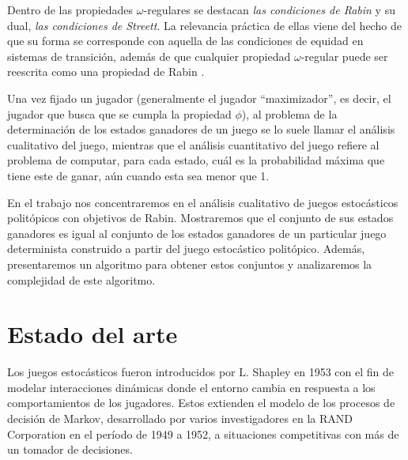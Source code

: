 Dentro de las propiedades $\omega$-regulares se destacan \textit{las
	condiciones de Rabin} y su dual, \textit{las condiciones de Streett}. La
relevancia práctica de ellas viene del hecho de que su forma se corresponde con
aquella de las condiciones de equidad en sistemas de transición, además de que
cualquier propiedad $\omega$-regular puede ser reescrita como una propiedad de
Rabin \cite{AutomataLogicsInfiniteGames}.

Una vez fijado un jugador (generalmente el jugador ``maximizador'', es decir,
el jugador que busca que se cumpla la propiedad $\phi$), al problema de la
determinación de los estados ganadores de un juego se lo suele llamar el
análisis cualitativo del juego, mientras que el análisis cuantitativo del juego
refiere al problema de computar, para cada estado, cuál es la probabilidad
máxima que tiene este de ganar, aún cuando esta sea menor que 1.

En el trabajo nos concentraremos en el análisis cualitativo de juegos
estocásticos politópicos con objetivos de Rabin. Mostraremos que el conjunto de
sus estados ganadores es igual al conjunto de los estados ganadores de un
particular juego determinista construido a partir del juego estocástico
politópico. Además, presentaremos un algoritmo para obtener estos conjuntos y
analizaremos la complejidad de este algoritmo.



\section{Estado del arte}

Los juegos estocásticos fueron introducidos por L. Shapley en 1953
\cite{Shapley1953} con el fin de modelar interacciones dinámicas donde el
entorno cambia en respuesta a los comportamientos de los jugadores. Estos
extienden el modelo de los procesos de decisión de Markov, desarrollado por
varios investigadores en la RAND Corporation en el período de 1949 a 1952, a
situaciones competitivas con más de un tomador de decisiones.

